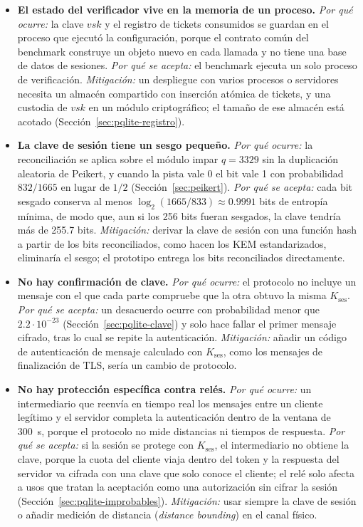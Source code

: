 \begin{itemize}
    \item \textbf{El estado del verificador vive en la memoria de un proceso.}
    \textit{Por qué ocurre:} la clave $vsk$ y el registro de tickets consumidos se guardan en el proceso que ejecutó la configuración, porque el contrato común del benchmark construye un objeto nuevo en cada llamada y no tiene una base de datos de sesiones.
    \textit{Por qué se acepta:} el benchmark ejecuta un solo proceso de verificación.
    \textit{Mitigación:} un despliegue con varios procesos o servidores necesita un almacén compartido con inserción atómica de tickets, y una custodia de $vsk$ en un módulo criptográfico; el tamaño de ese almacén está acotado (Sección~\ref{sec:pqlite-registro}).

    \item \textbf{La clave de sesión tiene un sesgo pequeño.}
    \textit{Por qué ocurre:} la reconciliación se aplica sobre el módulo impar $q = 3329$ sin la duplicación aleatoria de Peikert, y cuando la pista vale 0 el bit vale 1 con probabilidad $832/1665$ en lugar de $1/2$ (Sección~\ref{sec:peikert}).
    \textit{Por qué se acepta:} cada bit sesgado conserva al menos $\log_2(1665/833) \approx 0.9991$ bits de entropía mínima, de modo que, aun si los 256 bits fueran sesgados, la clave tendría más de 255.7 bits.
    \textit{Mitigación:} derivar la clave de sesión con una función hash a partir de los bits reconciliados, como hacen los KEM estandarizados, eliminaría el sesgo; el prototipo entrega los bits reconciliados directamente.

    \item \textbf{No hay confirmación de clave.}
    \textit{Por qué ocurre:} el protocolo no incluye un mensaje con el que cada parte compruebe que la otra obtuvo la misma $K_{\text{ses}}$.
    \textit{Por qué se acepta:} un desacuerdo ocurre con probabilidad menor que $2.2 \cdot 10^{-23}$ (Sección~\ref{sec:pqlite-clave}) y solo hace fallar el primer mensaje cifrado, tras lo cual se repite la autenticación.
    \textit{Mitigación:} añadir un código de autenticación de mensaje calculado con $K_{\text{ses}}$, como los mensajes de finalización de TLS, sería un cambio de protocolo.

    \item \textbf{No hay protección específica contra relés.}
    \textit{Por qué ocurre:} un intermediario que reenvía en tiempo real los mensajes entre un cliente legítimo y el servidor completa la autenticación dentro de la ventana de 300~s, porque el protocolo no mide distancias ni tiempos de respuesta.
    \textit{Por qué se acepta:} si la sesión se protege con $K_{\text{ses}}$, el intermediario no obtiene la clave, porque la cuota del cliente viaja dentro del token y la respuesta del servidor va cifrada con una clave que solo conoce el cliente; el relé solo afecta a usos que tratan la aceptación como una autorización sin cifrar la sesión (Sección~\ref{sec:pqlite-improbables}).
    \textit{Mitigación:} usar siempre la clave de sesión o añadir medición de distancia (\textit{distance bounding}) en el canal físico.
\end{itemize}

